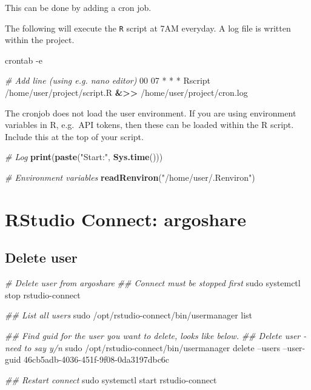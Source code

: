 \documentclass[
]{book}
\newenvironment{Shaded}{\begin{snugshade}}{\end{snugshade}}
\newcommand{\CommentTok}[1]{\textcolor[rgb]{0.56,0.35,0.01}{\textit{#1}}}
\newcommand{\ExtensionTok}[1]{#1}
\newcommand{\FunctionTok}[1]{\textcolor[rgb]{0.00,0.00,0.00}{#1}}
\newcommand{\KeywordTok}[1]{\textcolor[rgb]{0.13,0.29,0.53}{\textbf{#1}}}
\newcommand{\NormalTok}[1]{#1}
\newcommand{\OperatorTok}[1]{\textcolor[rgb]{0.81,0.36,0.00}{\textbf{#1}}}
\newcommand{\StringTok}[1]{\textcolor[rgb]{0.31,0.60,0.02}{#1}}
\begin{document}
This can be done by adding a cron job.

The following will execute the \texttt{R} script at 7AM everyday. A log file is written within the project.

\begin{Shaded}
\begin{Highlighting}[]
\ExtensionTok{crontab}\NormalTok{ -e}

\CommentTok{# Add line (using e.g. nano editor)}
\ExtensionTok{00}\NormalTok{ 07 * * * Rscript /home/user/project/script.R }\OperatorTok{&>>}\NormalTok{ /home/user/project/cron.log}
\end{Highlighting}
\end{Shaded}

The cronjob does not load the user environment.
If you are using environment variables in R, e.g.~API tokens, then these can be loaded within the R script.
Include this at the top of your script.

\begin{Shaded}
\begin{Highlighting}[]
\CommentTok{# Log}
\KeywordTok{print}\NormalTok{(}\KeywordTok{paste}\NormalTok{(}\StringTok{"Start:"}\NormalTok{, }\KeywordTok{Sys.time}\NormalTok{()))}

\CommentTok{# Environment variables}
\KeywordTok{readRenviron}\NormalTok{(}\StringTok{"/home/user/.Renviron"}\NormalTok{)}
\end{Highlighting}
\end{Shaded}

\hypertarget{rstudio-connect-argoshare}{%
\section{RStudio Connect: argoshare}\label{rstudio-connect-argoshare}}

\hypertarget{delete-user}{%
\subsection{Delete user}\label{delete-user}}

\begin{Shaded}
\begin{Highlighting}[]
\CommentTok{# Delete user from argoshare}
\CommentTok{## Connect must be stopped first}
\FunctionTok{sudo}\NormalTok{ systemctl stop rstudio-connect}

\CommentTok{## List all users}
\FunctionTok{sudo}\NormalTok{ /opt/rstudio-connect/bin/usermanager list}

\CommentTok{## Find guid for the user you want to delete, looks like below. }
\CommentTok{## Delete user - need to say y/n}
\FunctionTok{sudo}\NormalTok{ /opt/rstudio-connect/bin/usermanager delete --users --user-guid 46cb5adb-4036-451f-9f08-0da3197dbc6c}

\CommentTok{## Restart connect}
\FunctionTok{sudo}\NormalTok{ systemctl start rstudio-connect}
\end{Highlighting}
\end{Shaded}
\end{document}
